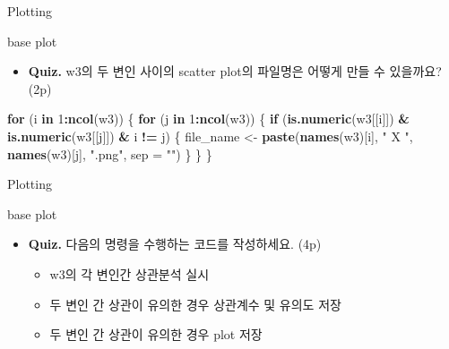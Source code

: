 \documentclass[ignorenonframetext,]{beamer}
\newenvironment{Shaded}{\begin{snugshade}}{\end{snugshade}}
\newcommand{\KeywordTok}[1]{\textcolor[rgb]{0.13,0.29,0.53}{\textbf{#1}}}
\newcommand{\DataTypeTok}[1]{\textcolor[rgb]{0.13,0.29,0.53}{#1}}
\newcommand{\DecValTok}[1]{\textcolor[rgb]{0.00,0.00,0.81}{#1}}
\newcommand{\StringTok}[1]{\textcolor[rgb]{0.31,0.60,0.02}{#1}}
\newcommand{\ControlFlowTok}[1]{\textcolor[rgb]{0.13,0.29,0.53}{\textbf{#1}}}
\newcommand{\OperatorTok}[1]{\textcolor[rgb]{0.81,0.36,0.00}{\textbf{#1}}}
\newcommand{\NormalTok}[1]{#1}
\providecommand{\tightlist}{%
  \setlength{\itemsep}{0pt}\setlength{\parskip}{0pt}}
\begin{document}
\begin{frame}[fragile]{Plotting}

\begin{block}{base plot}

\begin{itemize}
\tightlist
\item
  \textbf{Quiz.} w3의 두 변인 사이의 scatter plot의 파일명은 어떻게 만들
  수 있을까요? (2p)
\end{itemize}

\begin{Shaded}
\begin{Highlighting}[]
\ControlFlowTok{for}\NormalTok{ (i }\ControlFlowTok{in} \DecValTok{1}\OperatorTok{:}\KeywordTok{ncol}\NormalTok{(w3)) \{}
    \ControlFlowTok{for}\NormalTok{ (j }\ControlFlowTok{in} \DecValTok{1}\OperatorTok{:}\KeywordTok{ncol}\NormalTok{(w3)) \{}
    \ControlFlowTok{if}\NormalTok{ (}\KeywordTok{is.numeric}\NormalTok{(w3[[i]]) }\OperatorTok{&}\StringTok{ }\KeywordTok{is.numeric}\NormalTok{(w3[[j]])  }\OperatorTok{&}\StringTok{ }\NormalTok{i }\OperatorTok{!=}\StringTok{ }\NormalTok{j) \{}
\NormalTok{    file_name <-}
\StringTok{    }\KeywordTok{paste}\NormalTok{(}\KeywordTok{names}\NormalTok{(w3)[i], }\StringTok{" X "}\NormalTok{, }\KeywordTok{names}\NormalTok{(w3)[j], }\StringTok{".png"}\NormalTok{, }\DataTypeTok{sep =} \StringTok{""}\NormalTok{)}
\NormalTok{    \}}
\NormalTok{    \}}
\NormalTok{\}}
\end{Highlighting}
\end{Shaded}

\end{block}

\end{frame}

\begin{frame}{Plotting}

\begin{block}{base plot}

\begin{itemize}
\item
  \textbf{Quiz.} 다음의 명령을 수행하는 코드를 작성하세요. (4p)

  \begin{itemize}
  \tightlist
  \item
    w3의 각 변인간 상관분석 실시
  \item
    두 변인 간 상관이 유의한 경우 상관계수 및 유의도 저장
  \item
    두 변인 간 상관이 유의한 경우 plot 저장
  \end{itemize}
\end{itemize}

\end{block}

\end{frame}
\end{document}
